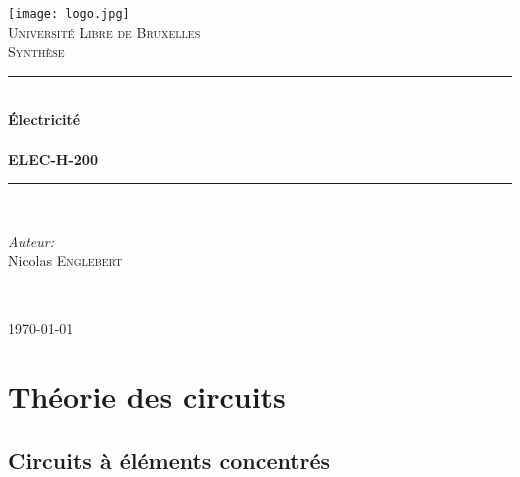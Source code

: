\documentclass	[11pt, a4paper, openany]{book}
\begin{document}
\renewcommand{\proofname}{Démonstration}
\frontmatter
\begin{titlepage}
	\begin{center}	
			
		\newcommand{\HRule}{\rule{\linewidth}{0.5mm}}   			%
		\texttt{[image: logo.jpg]}~\\[1cm]				%
			
			\textsc{\LARGE Université Libre de Bruxelles}\\[1.5cm]
			\textsc{\Large Synthèse}\\[0.5cm]
			
			\HRule \\[0.4cm]
			{ \huge \bfseries Électricité \\ \ \\ ELEC-H-200 \\[0.4cm] }
			
			
			\HRule \\[1.5cm]
			\begin{minipage}{0.4\textwidth}
				\begin{flushleft} \large
							
					\emph{Auteur:}\\
					Nicolas \textsc{Englebert}\\
				\end{flushleft}
			\end{minipage}
			\begin{minipage}{0.4\textwidth}
				\begin{flushright} \large
					\emph{} \\		
					\textsc{}
				\end{flushright}
			\end{minipage}
			
			\vfill
			
			{\large \today}
			
		\end{center}
	\end{titlepage}
	
	\tableofcontents
	
	
	
	
	\mainmatter
	\part{Théorie des circuits}
	\chapter{Circuits à éléments concentrés}
\end{document}

